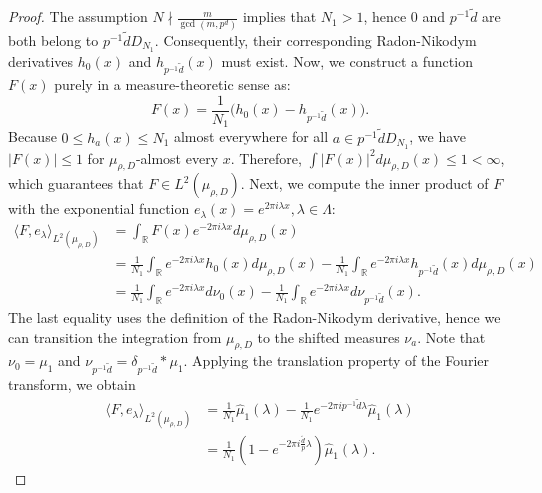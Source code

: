 \documentclass[11pt]{article}
\numberwithin{equation}{section}
\begin{document}
\begin{proof}
The assumption $N\nmid\frac{m}{\gcd(m,p^d)}$ implies that $N_1>1$, hence
 $0$ and $p^{-1}\tilde{d}$ are both belong to $p^{-1}\tilde{d}D_{N_1}$. Consequently, their corresponding Radon-Nikodym derivatives $h_0(x)$ and $h_{p^{-1}\tilde{d}}(x)$ must exist.
Now, we construct a function $F(x)$ purely in a measure-theoretic sense as:
\begin{equation}\label{3.13}
	F(x) = \frac{1}{N_1} \Big( h_0(x) - h_{p^{-1}\tilde{d}}(x) \Big).
\end{equation}
Because $0 \le h_a(x) \le N_1$ almost everywhere for all $a\in p^{-1}\tilde{d}D_{N_1}$, we  have $|F(x)| \le 1$ for $\mu_{\rho,D}$-almost every $x$. Therefore, $\int |F(x)|^2 d\mu_{\rho,D}(x) \le 1 < \infty$, which  guarantees that $F \in L^2(\mu_{\rho,D})$. 
Next, we compute the inner product of $F$ with the exponential function $e_\lambda(x) = e^{2\pi i \lambda x},\lambda\in \Lambda$: 
\begin{equation*}
	\begin{aligned}
		\langle F, e_\lambda \rangle_{L^2(\mu_{\rho,D})} &= \int_{\mathbb{R}} F(x) e^{-2\pi i \lambda x} d\mu_{\rho,D}(x) \\
		&= \frac{1}{N_1} \int_{\mathbb{R}} e^{-2\pi i \lambda x} h_0(x) d\mu_{\rho,D}(x) - \frac{1}{N_1} \int_{\mathbb{R}} e^{-2\pi i \lambda x} h_{p^{-1}\tilde{d}}(x) d\mu_{\rho,D}(x) \\
		&= \frac{1}{N_1} \int_{\mathbb{R}} e^{-2\pi i \lambda x} d\nu_0(x) - \frac{1}{N_1} \int_{\mathbb{R}} e^{-2\pi i \lambda x} d\nu_{p^{-1}\tilde{d}}(x).
	\end{aligned}
\end{equation*}
The last equality uses  the definition of the Radon-Nikodym derivative, hence we can transition the integration from  $\mu_{\rho,D}$ to the shifted measures $\nu_a$.
Note that $\nu_0 = \mu_1$ and $\nu_{p^{-1}\tilde{d}} = \delta_{p^{-1}\tilde{d}} \ast \mu_1$.  Applying the translation property of the Fourier transform, we obtain
\begin{equation*}
	\begin{aligned}
		\langle F, e_\lambda \rangle_{L^2(\mu_{\rho,D})} &= \frac{1}{N_1} \widehat{\mu}_1(\lambda) - \frac{1}{N_1} e^{-2\pi i p^{-1}\tilde{d} \lambda} \widehat{\mu}_1(\lambda) \\
		&= \frac{1}{N_1} \left( 1 - e^{-2\pi i \frac{\tilde{d}}{p} \lambda} \right) \widehat{\mu}_1(\lambda).
	\end{aligned}

\end{equation*}
\end{proof}
\end{document}
